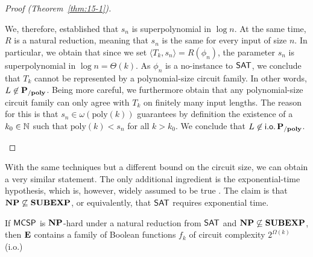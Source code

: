 \documentclass[11pt]{article}
\begin{document}
\begin{proof}[Proof (Theorem~\ref{thm:15-1})]
\begin{itemize}
\begin{enumerate}[(i)]
          We, therefore, established that $s_n$ is superpolynomial in $\log n$.
          At the same time, $R$ is a natural reduction, meaning that $s_n$ is
          the same for every input of size $n$.
          In particular, we obtain that since we set
          $\langle T_k, s_n \rangle = R(\phi_n)$, the parameter
          $s_n$ is superpolynomial in $\log n = \Theta(k)$.
          As $\phi_n$ is a no-instance to $\mathsf{SAT}$, we conclude that
          $T_k$ cannot be represented by a polynomial-size circuit family.
          In other words, $L \not\in \mathbf{P_{/poly}}$.
          Being more careful, we furthermore obtain that any polynomial-size
          circuit family can only agree with $T_k$ on finitely many
          input lengths. The reason for this is that
          $s_n \in \omega(\mathrm{poly}(k))$ guarantees
          by definition the existence of a $k_0 \in {\mathbb{N}}$ such that
          $\mathrm{poly}(k) < s_n$ for all $k > k_0$.
          We conclude that $L \not\in \mathsf{i.o.}\, \mathbf{P_{/poly}}$.
      \end{enumerate}
	\end{itemize}
\end{proof}

With the same techniques but a different bound on the circuit size, we can
obtain a very similar statement. The only additional ingredient is
the exponential-time hypothesis, which is, however, widely assumed to
be true \cite{impagliazzo99}.
The claim is that $\mathbf{NP} \not\subseteq \mathbf{SUBEXP}$, or equivalently, that
$\mathsf{SAT}$ requires exponential time.

\begin{theorem}[\cite{10.1145/335305.335314}]
  \label{thm:15-2}
  If $\mathsf{MCSP}$ is $\mathbf{NP}$-hard under a natural reduction from
  $\mathsf{SAT}$ and $\mathbf{NP} \not\subseteq \mathbf{SUBEXP}$, then
  $\mathbf{E}$ contains a family of Boolean functions
  $f_k$ of circuit complexity $2^{\Omega(k)}$ (i.o.)
\end{theorem}
\end{document}
